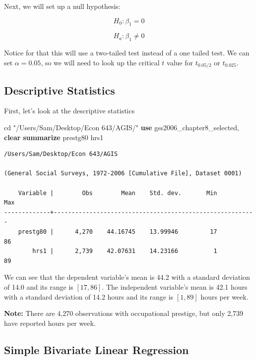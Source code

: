 \documentclass[
]{book}
\newenvironment{Shaded}{\begin{snugshade}}{\end{snugshade}}
\newcommand{\KeywordTok}[1]{\textcolor[rgb]{0.13,0.29,0.53}{\textbf{#1}}}
\newcommand{\NormalTok}[1]{#1}
\newcommand{\StringTok}[1]{\textcolor[rgb]{0.31,0.60,0.02}{#1}}
\begin{document}
Next, we will set up a null hypothesis:

\[ H_{0}: \beta_1 = 0 \]

\[ H_{a}: \beta_1 \neq 0 \]

Notice for that this will use a two-tailed test instead of a one tailed test. We can set \(\alpha=0.05\), so we will need to look up the critical \(t\) value for \(t_{0.05/2}\) or \(t_{0.025}\).

\subsection{Descriptive Statistics}\label{descriptive-statistics}

First, let's look at the descriptive statistics

\begin{Shaded}
\begin{Highlighting}[]
\NormalTok{cd }\StringTok{"/Users/Sam/Desktop/Econ 643/AGIS/"}
\KeywordTok{use}\NormalTok{ gss2006\_chapter8\_selected, }\KeywordTok{clear}
\KeywordTok{summarize}\NormalTok{ prestg80 hrs1}
\end{Highlighting}
\end{Shaded}

\begin{verbatim}
/Users/Sam/Desktop/Econ 643/AGIS

(General Social Surveys, 1972-2006 [Cumulative File], Dataset 0001)

    Variable |        Obs        Mean    Std. dev.       Min        Max
-------------+---------------------------------------------------------
    prestg80 |      4,270    44.16745    13.99946         17         86
        hrs1 |      2,739    42.07631    14.23166          1         89
\end{verbatim}

We can see that the dependent variable's mean is 44.2 with a standard deviation of 14.0 and its range is \([17, 86]\). The independent variable's mean is 42.1 hours with a standard deviation of 14.2 hours and its range is \([1,89]\) hours per week.

\textbf{Note:} There are 4,270 observations with occupational prestige, but only 2,739 have reported hours per week.

\subsection{Simple Bivariate Linear Regression}\label{simple-bivariate-linear-regression}
\end{document}
